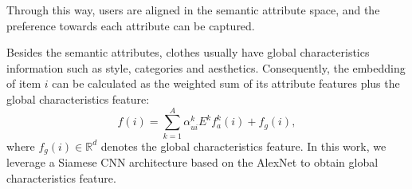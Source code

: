 \documentclass{article}
\begin{document}
Through this way, users are aligned in the semantic attribute space, and the preference towards each attribute can be captured.

Besides the semantic attributes, clothes usually have global characteristics information such as style,  categories and aesthetics. Consequently, 
the embedding of item $i$ can be calculated as the weighted sum of its attribute features plus the global characteristics feature:
\begin{equation}
    f ( i ) = \sum _ { k = 1 } ^ { A } \alpha _ { ui } ^ { k } E^k f_a^k(i) + f_g(i),
\end{equation}
where $f_g(i) \in \mathbb{R}^d$ denotes the global characteristics feature. In this work, we leverage a Siamese CNN architecture based on the AlexNet \cite{krizhevsky2012imagenet} to obtain global characteristics feature.
\end{document}
